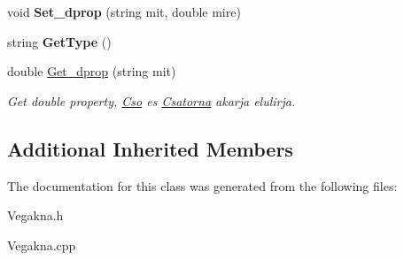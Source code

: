 \begin{DoxyCompactItemize}
void {\bfseries Set\+\_\+dprop} (string mit, double mire)
\item 
\hypertarget{class_vegakna_a623a4d644d9b76f48358738df22b9865}{}\label{class_vegakna_a623a4d644d9b76f48358738df22b9865} 
string {\bfseries Get\+Type} ()
\item 
\hypertarget{class_vegakna_a262a9880ff91b0d2f0cf3c6f28641913}{}\label{class_vegakna_a262a9880ff91b0d2f0cf3c6f28641913} 
double \hyperlink{class_vegakna_a262a9880ff91b0d2f0cf3c6f28641913}{Get\+\_\+dprop} (string mit)
\begin{DoxyCompactList}\small\item\em Get double property, \hyperlink{class_cso}{Cso} es \hyperlink{class_csatorna}{Csatorna} akarja elulirja. \end{DoxyCompactList}\end{DoxyCompactItemize}
\subsection*{Additional Inherited Members}


The documentation for this class was generated from the following files\+:\begin{DoxyCompactItemize}
\item 
Vegakna.\+h\item 
Vegakna.\+cpp\end{DoxyCompactItemize}
